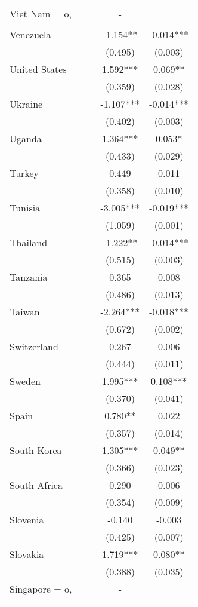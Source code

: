 \documentclass[]{article}
\begin{document}
\begin{tabular}{lcccc}
Viet Nam = o, &  &  & - &  \\
 &  &  &  &  \\
Venezuela &  &  & -1.154** & -0.014*** \\
 &  &  & (0.495) & (0.003) \\
United States &  &  & 1.592*** & 0.069** \\
 &  &  & (0.359) & (0.028) \\
Ukraine &  &  & -1.107*** & -0.014*** \\
 &  &  & (0.402) & (0.003) \\
Uganda &  &  & 1.364*** & 0.053* \\
 &  &  & (0.433) & (0.029) \\
Turkey &  &  & 0.449 & 0.011 \\
 &  &  & (0.358) & (0.010) \\
Tunisia &  &  & -3.005*** & -0.019*** \\
 &  &  & (1.059) & (0.001) \\
Thailand &  &  & -1.222** & -0.014*** \\
 &  &  & (0.515) & (0.003) \\
Tanzania &  &  & 0.365 & 0.008 \\
 &  &  & (0.486) & (0.013) \\
Taiwan &  &  & -2.264*** & -0.018*** \\
 &  &  & (0.672) & (0.002) \\
Switzerland &  &  & 0.267 & 0.006 \\
 &  &  & (0.444) & (0.011) \\
Sweden &  &  & 1.995*** & 0.108*** \\
 &  &  & (0.370) & (0.041) \\
Spain &  &  & 0.780** & 0.022 \\
 &  &  & (0.357) & (0.014) \\
South Korea &  &  & 1.305*** & 0.049** \\
 &  &  & (0.366) & (0.023) \\
South Africa &  &  & 0.290 & 0.006 \\
 &  &  & (0.354) & (0.009) \\
Slovenia &  &  & -0.140 & -0.003 \\
 &  &  & (0.425) & (0.007) \\
Slovakia &  &  & 1.719*** & 0.080** \\
 &  &  & (0.388) & (0.035) \\
Singapore = o, &  &  & - &  \\
 &  &  &  &  \\

\end{tabular}
\end{document}
